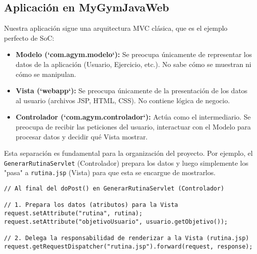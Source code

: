 \documentclass[11pt,a4paper]{article}
\begin{document}
\subsection{Aplicación en MyGymJavaWeb}
Nuestra aplicación sigue una arquitectura MVC clásica, que es el ejemplo perfecto de SoC:
\begin{itemize}
    \item \textbf{Modelo (`com.agym.modelo`):} Se preocupa únicamente de representar los datos de la aplicación (Usuario, Ejercicio, etc.). No sabe cómo se muestran ni cómo se manipulan.
    \item \textbf{Vista (`webapp`):} Se preocupa únicamente de la presentación de los datos al usuario (archivos JSP, HTML, CSS). No contiene lógica de negocio.
    \item \textbf{Controlador (`com.agym.controlador`):} Actúa como el intermediario. Se preocupa de recibir las peticiones del usuario, interactuar con el Modelo para procesar datos y decidir qué Vista mostrar.
\end{itemize}
Esta separación es fundamental para la organización del proyecto. Por ejemplo, el \texttt{GenerarRutinaServlet} (Controlador) prepara los datos y luego simplemente los "pasa" a \texttt{rutina.jsp} (Vista) para que esta se encargue de mostrarlos.
\begin{lstlisting}[caption={El Controlador delega la presentación a la Vista}]
// Al final del doPost() en GenerarRutinaServlet (Controlador)

// 1. Prepara los datos (atributos) para la Vista
request.setAttribute("rutina", rutina);
request.setAttribute("objetivoUsuario", usuario.getObjetivo());

// 2. Delega la responsabilidad de renderizar a la Vista (rutina.jsp)
request.getRequestDispatcher("rutina.jsp").forward(request, response);
\end{lstlisting}
\end{document}

